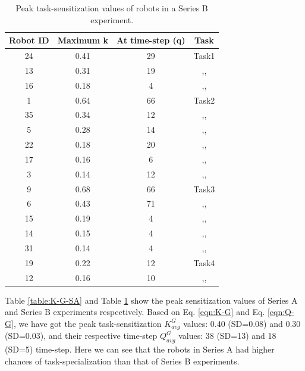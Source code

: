 \documentclass[smallcondensed]{svjour3}
\begin{document}
\begin{table}
\centering
\caption{Peak task-sensitization values of robots in a Series B experiment.}
\begin{tabular}{|c|c|c|c|}
\hline \textbf{Robot ID} & \textbf{Maximum k} & \textbf{At time-step (q)} & \textbf{Task} \\
\hline 24 & 0.41 & 29 & Task1\\
\hline 13 & 0.31 & 19 & ,,\\
\hline 16 & 0.18 & 4 & ,,\\
\hline 1 & 0.64 & 66 & Task2\\
\hline 35 & 0.34 & 12 & ,,\\
\hline 5 & 0.28 & 14 & ,,\\
\hline 22 & 0.18 & 20 & ,,\\
\hline 17 & 0.16 & 6 & ,,\\
\hline 3 & 0.14 & 12 & ,,\\
\hline 9 & 0.68 & 66 & Task3\\
\hline 6 & 0.43 & 71 & ,,\\
\hline 15 & 0.19 & 4 & ,,\\
\hline 14 & 0.15 & 4 & ,,\\
\hline 31 & 0.14 & 4 & ,,\\
\hline 19 & 0.22 & 12 & Task4\\
\hline 12 & 0.16 & 10 & ,,\\
\hline 
\end{tabular} 
\label{table:K-G-SB}
\end{table}
Table \ref{table:K-G-SA} and Table \ref{table:K-G-SB} show the peak sensitization values of Series A and Series B experiments respectively.  Based on Eq. \ref{eqn:K-G} and Eq. \ref{eqn:Q-G}, we have got the peak task-sensitization $K^G_{avg} 
$ values: 0.40 (SD=0.08)  and 0.30 (SD=0.03), and their respective time-step $Q^G_{avg}$ values: 38 (SD=13) and 18 (SD=5) time-step. Here we can see that the robots in Series A had higher chances of task-specialization than that of Series B experiments.
\end{document}
